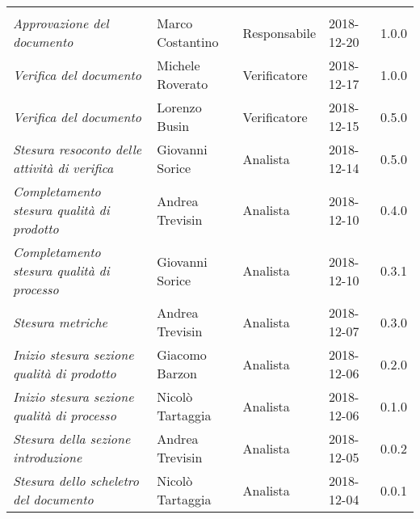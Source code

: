 \newpage 
\section*{}
\begin{table}[H]
	\centering
	\begin{tabular}{p{4cm}|C{3cm}|C{3cm}|R{2.5cm}|R{2cm}}
		
		 & & & & \\
		
		
		\emph{Approvazione del documento} & Marco Costantino & Responsabile & 2018-12-20 & 1.0.0 \\
		\hline
		
		\emph{Verifica del documento} & Michele Roverato & Verificatore & 2018-12-17 & 1.0.0 \\
		\hline
		
		\emph{Verifica del documento} & Lorenzo Busin & Verificatore & 2018-12-15 & 0.5.0 \\
		\hline
		
		\emph{Stesura resoconto delle attività di verifica} & Giovanni Sorice & Analista & 2018-12-14 & 0.5.0 \\
		\hline
		
		\emph{Completamento stesura qualità di prodotto} & Andrea Trevisin & Analista & 2018-12-10 & 0.4.0 \\
		\hline
		
		\emph{Completamento stesura qualità di processo} & Giovanni Sorice & Analista & 2018-12-10 & 0.3.1 \\
		\hline
		
		\emph{Stesura metriche} & Andrea Trevisin & Analista & 2018-12-07 & 0.3.0 \\
		\hline
		
		\emph{Inizio stesura sezione qualità di prodotto} & Giacomo Barzon & Analista & 2018-12-06 & 0.2.0 \\
		\hline
		
		\emph{Inizio stesura sezione qualità di processo} & Nicolò Tartaggia & Analista & 2018-12-06 & 0.1.0 \\
		\hline
		
		\emph{Stesura della sezione introduzione } & Andrea Trevisin & Analista & 2018-12-05 & 0.0.2 \\
		\hline
		
		\emph{Stesura dello scheletro del documento} & Nicolò Tartaggia & Analista & 2018-12-04 & 0.0.1 \\
		
	\end{tabular}
	
\end{table}


\clearpage